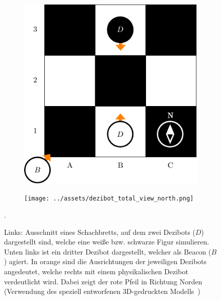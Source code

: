 \begin{figure}[h]
    \centering
    \begin{subfigure}[c]{0.49\textwidth}
        \includegraphics[width=\textwidth]{../assets/usage.drawio.pdf}
    \end{subfigure}
    \hspace{0.5em}
    \begin{subfigure}[c]{0.47\textwidth}
        \texttt{[image: ../assets/dezibot\_total\_view\_north.png]}
    \end{subfigure}
    \caption{Links: Ausschnitt eines Schachbretts, auf dem zwei Dezibots ($D$) dargestellt sind, welche eine weiße bzw. schwarze Figur simulieren. Unten links ist ein dritter Dezibot dargestellt, welcher als Beacon ($B$) agiert. In orange sind die Ausrichtungen der jeweiligen Dezibots angedeutet, welche rechts mit einem physikalischen Dezibot verdeutlicht wird. Dabei zeigt der rote Pfeil in Richtung Norden (Verwendung des speziell entworfenen 3D-gedruckten Modells~\cite[vgl.][]{felttipDezibotAlignmentPointer2025})}.
    \label{fig:usage}
\end{figure}

